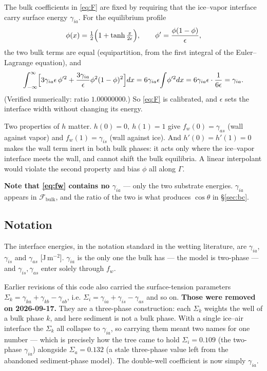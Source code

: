 \documentclass[11pt,a4paper]{article}
\newcommand{\sia}{\gamma_{ia}}
\newcommand{\sis}{\gamma_{is}}
\newcommand{\sas}{\gamma_{as}}
\newcommand{\eps}{\epsilon}
\begin{document}
The bulk coefficients in \eqref{eq:F} are fixed by requiring that the ice--vapor
interface carry surface energy $\sia$. For the equilibrium profile
\begin{equation}
\phi(x)=\tfrac12\Bigl(1+\tanh\tfrac{x}{2\eps}\Bigr),
\qquad
\phi'=\frac{\phi(1-\phi)}{\eps},
\label{eq:profile}
\end{equation}
the two bulk terms are equal (equipartition, from the first integral of the
Euler--Lagrange equation), and
\begin{equation}
\int_{-\infty}^{\infty}\Bigl[3\sia\eps\,\phi'^{2}+\frac{3\sia}{\eps}\phi^{2}(1-\phi)^{2}\Bigr]dx
=6\sia\eps\!\int\!\phi'^{2}dx
=6\sia\eps\cdot\frac{1}{6\eps}
=\sia .
\label{eq:excess}
\end{equation}
(Verified numerically: ratio $1.00000000$.) So \eqref{eq:F} is calibrated, and
$\eps$ sets the interface width without changing its energy.

Two properties of $h$ matter. $h(0)=0,\ h(1)=1$ give $f_w(0)=\sas$ (wall against
vapor) and $f_w(1)=\sis$ (wall against ice). And $h'(0)=h'(1)=0$ makes the wall
term inert in both bulk phases: it acts only where the ice--vapor interface
meets the wall, and cannot shift the bulk equilibria. A linear interpolant would
violate the second property and bias $\phi$ all along $\Gamma$.

\textbf{Note that \eqref{eq:fw} contains no $\sia$} --- only the two substrate
energies. $\sia$ appears in $\mathcal{F}_{\text{bulk}}$, and the ratio of the two
is what produces $\cos\theta$ in \S\ref{sec:bc}.

\subsection{Notation}

The interface energies, in the notation standard in the wetting literature, are $\sia$, $\sis$ and $\sas$
[J\,m$^{-2}$]. $\sia$ is the only one the bulk has --- the model is two-phase ---
and $\sis,\sas$ enter solely through $f_w$.

Earlier revisions of this code also carried the surface-tension parameters
$\Sigma_k=\gamma_{ka}+\gamma_{kb}-\gamma_{ab}$, i.e.
$\Sigma_i=\sia+\sis-\sas$ and so on. \textbf{Those were removed on
2026-09-17.} They are a three-phase construction: each $\Sigma_k$ weights the
well of a bulk phase $k$, and here sediment is not a bulk phase. With a single
ice--air interface the $\Sigma_k$ all collapse to $\sia$, so carrying them meant
two names for one number --- which is precisely how the tree came to hold
$\Sigma_i=0.109$ (the two-phase $\sia$) alongside $\Sigma_a=0.132$ (a stale
three-phase value left from the abandoned sediment-phase model). The double-well
coefficient is now simply $\sia$.
\end{document}

